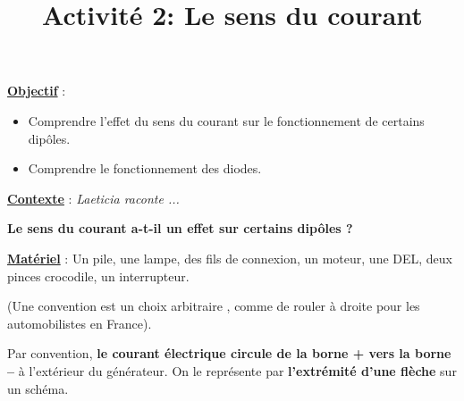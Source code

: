 \documentclass[10pt]{article}
\newcommand{\titreActivite}{Activité 2: Le sens du courant} %
\newcommand{\objectif}{ 	
	
	\begin{itemize}
		\item Comprendre l'effet du sens du courant sur le fonctionnement de certains dipôles.
		\item Comprendre le fonctionnement des diodes.
	\end{itemize}
} %
\newcommand{\contexte}{
	Laeticia raconte ...
}
\newcommand{\resumeContexte}{
	Le sens du courant a-t-il un effet sur certains dipôles ?
	} %
\begin{document}
\date{}
\title{\titreActivite}
\maketitle %


\underline{\textbf{Objectif}} :  \vspace{2pt}
\objectif

\vspace{4pt}

\underline{\textbf{Contexte}} :  \textit{\contexte}

\textbf{\resumeContexte}


\vspace{-12pt}


\textbf{\underline{Matériel}} : Un pile, une lampe, des fils de connexion, un moteur, une DEL, deux pinces
 crocodile, un
interrupteur.


\begin{mybox}[Convention]
	(Une convention est un choix arbitraire
	, comme de rouler à droite pour les automobilistes en France). 
	
	Par convention,
	\textbf{le courant électrique circule de la borne +
	vers la borne –} à l’extérieur du générateur.
	On le représente par \textbf{l’extrémité d’une flèche} sur un schéma.

\end{mybox}

\begin{question}
	
	\end{question}
\end{document}
